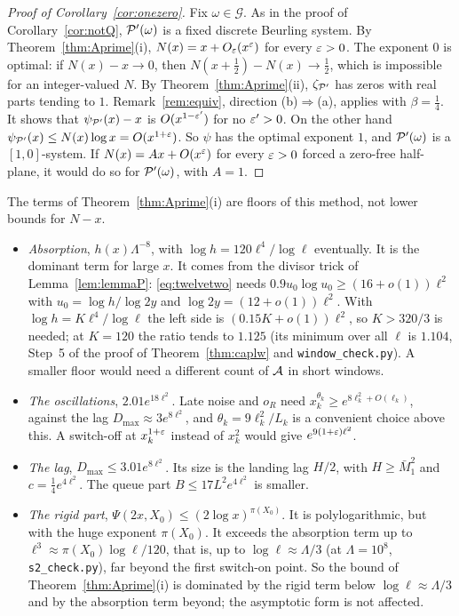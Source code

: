 \begin{proof}[Proof of Corollary~\ref{cor:onezero}]
Fix $\omega\in\mathcal G$. As in the proof of Corollary~\ref{cor:notQ}, $\mathcal{P}'(\omega)$ is a fixed discrete Beurling system. By
Theorem~\ref{thm:Aprime}(i), $N(x)=x+O_\varepsilon(x^\varepsilon)$ for every $\varepsilon>0$. The exponent $0$ is optimal: if $N(x)-x\to0$, then
$N(x+\frac12)-N(x)\to\frac12$, which is impossible for an integer-valued $N$. By Theorem~\ref{thm:Aprime}(ii), $\zeta_{\mathcal{P}'}$ has zeros with real parts tending
to $1$. Remark~\ref{rem:equiv}, direction (b)$\Rightarrow$(a), applies with $\beta=\frac14$. It shows that $\psi_{\mathcal{P}'}(x)-x$ is
$O(x^{1-\varepsilon'})$ for no $\varepsilon'>0$. On the other hand $\psi_{\mathcal{P}'}(x)\le N(x)\log x=O(x^{1+\varepsilon})$. So $\psi$ has the optimal exponent
$1$, and $\mathcal{P}'(\omega)$ is a $[1,0]$-system. If $N(x)=Ax+O(x^\varepsilon)$ for every $\varepsilon>0$ forced a zero-free half-plane, it would do so for
$\mathcal{P}'(\omega)$, with $A=1$.
\end{proof}

\begin{remark}\label{rem:onezero-floors}
The terms of Theorem~\ref{thm:Aprime}(i) are floors of this method, not lower bounds for $N-x$.
\begin{itemize}
\item \emph{Absorption}, $h(x)\Lambda^{-8}$, with $\log h=120\ell^4/\log\ell$ eventually. It is the dominant term for large $x$. It comes
from the
divisor trick of Lemma~\ref{lem:lemmaP}: \eqref{eq:twelvetwo} needs $0.9u_0\log u_0\ge(16+o(1))\ell^2$ with
$u_0=\log h/\log2y$ and $\log2y=(12+o(1))\ell^2$. With $\log h=K\ell^4/\log\ell$ the left side is $(0.15K+o(1))\ell^2$, so $K>320/3$
is needed; at $K=120$ the ratio tends to $1.125$ (its minimum over all $\ell$ is $1.104$, Step~5 of the proof of
Theorem~\ref{thm:caplw} and \texttt{window\_check.py}). A smaller floor would need a different count of $\mathcal{A}$ in short windows.
\item \emph{The oscillations}, $2.01e^{18\ell^2}$. Late noise and $o_R$ need $x_k^{\theta_k}\ge e^{8\ell_k^2+O(\ell_k)}$, against the lag
$D_{\max}\approx3e^{8\ell^2}$, and $\theta_k=9\ell_k^2/L_k$ is a convenient choice above this. A switch-off at $x_k^{1+\varepsilon}$ instead of $x_k^2$ would give $e^{9(1+\varepsilon)\ell^2}$.
\item \emph{The lag}, $D_{\max}\le3.01e^{8\ell^2}$. Its size is the landing lag $H/2$, with $H\ge\bar M_1^2$ and
$c=\frac14e^{4\ell^2}$. The queue part $B\le17L^2e^{4\ell^2}$ is smaller.
\item \emph{The rigid part}, $\Psi(2x,X_0)\le(2\log x)^{\pi(X_0)}$. It is polylogarithmic, but with the huge exponent $\pi(X_0)$. It
exceeds the absorption term up to $\ell^3\approx\pi(X_0)\log\ell/120$, that is, up to $\log\ell\approx\Lambda/3$ (at $\Lambda=10^8$,
\texttt{s2\_check.py}), far beyond the first switch-on point. So the bound of Theorem~\ref{thm:Aprime}(i) is dominated by the rigid term below
$\log\ell\approx\Lambda/3$ and by the absorption term beyond; the asymptotic form is not affected.
\end{itemize}
\end{remark}
\par\endgroup
